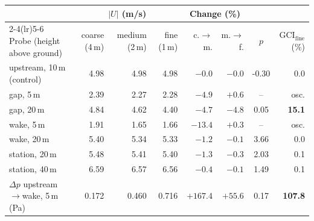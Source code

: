 \begin{tabular}{lrrrrrcr}
\toprule
 & \multicolumn{3}{c}{$|U|$ (m/s)} & \multicolumn{2}{c}{Change (\%)} & & \\
\cmidrule(lr){2-4}\cmidrule(lr){5-6}
Probe (height above ground) & coarse (4\,m) & medium (2\,m) & fine (1\,m) & c.$\to$m. & m.$\to$f. & $p$ & GCI$_\mathrm{fine}$ (\%) \\
\midrule
upstream, 10\,m (control) & 4.98 & 4.98 & 4.98 & $-0.0$ & $-0.0$ & -0.30 & 0.0 \\
gap, 5\,m & 2.39 & 2.27 & 2.28 & $-4.9$ & $+0.6$ & -- & osc. \\
gap, 20\,m & 4.84 & 4.62 & 4.40 & $-4.7$ & $-4.8$ & 0.05 & \textbf{15.1} \\
wake, 5\,m & 1.91 & 1.65 & 1.66 & $-13.4$ & $+0.3$ & -- & osc. \\
wake, 20\,m & 5.40 & 5.34 & 5.33 & $-1.2$ & $-0.1$ & 3.66 & 0.0 \\
station, 20\,m & 5.48 & 5.41 & 5.40 & $-1.3$ & $-0.3$ & 2.03 & 0.1 \\
station, 40\,m & 6.59 & 6.57 & 6.56 & $-0.4$ & $-0.1$ & 1.49 & 0.1 \\
\midrule
$\Delta p$ upstream$\to$wake, 5\,m (Pa) & 0.172 & 0.460 & 0.716 & $+167.4$ & $+55.6$ & 0.17 & \textbf{107.8} \\
\bottomrule
\end{tabular}
